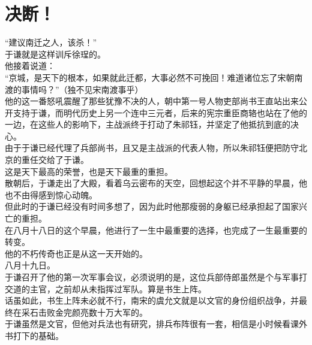 \section{决断！}
\ifnum{}
	\begin{multicols}{\theparacolNo}
\fi
“建议南迁之人，该杀！”\\

于谦就是这样训斥徐珵的。\\

他接着说道：\\

“京城，是天下的根本，如果就此迁都，大事必然不可挽回！难道诸位忘了宋朝南渡的事情吗？”（独不见宋南渡事乎）\\

他的这一番怒吼震醒了那些犹豫不决的人，朝中第一号人物吏部尚书王直站出来公开支持于谦，而明代历史上另一个连中三元者，后来的宪宗重臣商辂也站在了他的一边，在这些人的影响下，主战派终于打动了朱祁钰，并坚定了他抵抗到底的决心。\\

由于于谦已经代理了兵部尚书，且又是主战派的代表人物，所以朱祁钰便把防守北京的重任交给了于谦。\\

这是天下最高的荣誉，也是天下最重的重担。\\

散朝后，于谦走出了大殿，看着乌云密布的天空，回想起这个并不平静的早晨，他也不由得感到惊心动魄。\\

但此时的于谦已经没有时间多想了，因为此时他那瘦弱的身躯已经承担起了国家兴亡的重担。\\

在八月十八日的这个早晨，他进行了一生中最重要的选择，也完成了一生最重要的转变。\\

他的不朽传奇也正是从这一天开始的。\\

八月十九日。\\

于谦召开了他的第一次军事会议，必须说明的是，这位兵部侍郎虽然是个与军事打交道的主官，之前却从未指挥过军队。算是书生上阵。\\

话虽如此，书生上阵未必就不行，南宋的虞允文就是以文官的身份组织战争，并最终在采石击败金完颜亮数十万大军的。\\

于谦虽然是文官，但他对兵法也有研究，排兵布阵很有一套，相信是小时候看课外书打下的基础。\\


\end{multicols}
